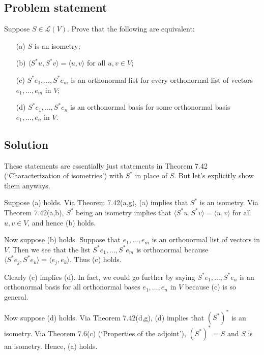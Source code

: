 \documentclass{article}
\begin{document}
\subsection*{Problem statement}
Suppose $S\in\mathcal{L}(V)$. Prove that the following are equivalent:
\begin{enumerate}
    \item[(a)] $S$ is an isometry;
    \item[(b)] $\langle S^*u,S^*v\rangle=\langle u,v\rangle$ for all $u,v\in V$;
    \item[(c)] $S^*e_1,\ldots,S^*e_m$ is an orthonormal list for every orthonormal list of vectors $e_1,\ldots,e_m$ in $V$;
    \item[(d)] $S^*e_1,\ldots,S^*e_n$ is an orthonormal basis for some orthonormal basis\\$e_1,\ldots,e_n$ in $V$.
\end{enumerate}

\subsection*{Solution}
These statements are essentially just statements in Theorem 7.42 (`Characterization of isometries') with $S^*$ in place of $S$. But let's explicitly show them anyways.

Suppose (a) holds. Via Theorem 7.42(a,g), (a) implies that $S^*$ is an isometry. Via Theorem 7.42(a,b), $S^*$ being an isometry implies that $\langle S^*u,S^*v\rangle=\langle u,v\rangle$ for all $u,v\in V$, and hence (b) holds. 

Now suppose (b) holds. Suppose that $e_1,\ldots,e_m$ is an orthonormal list of vectors in $V$. Then we see that the list $S^*e_1,\ldots,S^*e_m$ is orthonormal because $\langle S^*e_j,S^*e_k\rangle=\langle e_j,e_k\rangle$. Thus (c) holds.

Clearly (c) implies (d). In fact, we could go further by saying $S^*e_1,\ldots,S^*e_n$ is an orthonormal basis for all orthonormal bases $e_1,\ldots,e_n$ in $V$ because (c) is so general.

Now suppose (d) holds. Via Theorem 7.42(d,g), (d) implies that $(S^*)^*$ is an isometry. Via Theorem 7.6(c) (`Properties of the adjoint'), $(S^*)^*=S$ and $S$ is an isometry. Hence, (a) holds.
\end{document}
